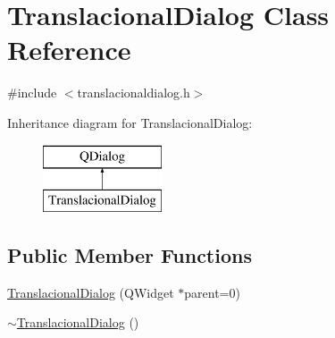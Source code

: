 \hypertarget{class_translacional_dialog}{\section{Translacional\-Dialog Class Reference}
\label{class_translacional_dialog}
}


{\ttfamily \#include $<$translacionaldialog.\-h$>$}

Inheritance diagram for Translacional\-Dialog\-:\begin{figure}[H]
\begin{center}
\leavevmode
\includegraphics[height=2.000000cm]{class_translacional_dialog}
\end{center}
\end{figure}
\subsection*{Public Member Functions}
\begin{DoxyCompactItemize}
\item 
\hyperlink{class_translacional_dialog_a37eadf7a9220ee5b7dfd07702345fb80}{Translacional\-Dialog} (Q\-Widget $\ast$parent=0)
\item 
\hyperlink{class_translacional_dialog_a88aec31c37285fc1016660ca6a05c637}{$\sim$\-Translacional\-Dialog} ()
\end{DoxyCompactItemize}


